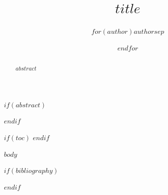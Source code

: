 \documentclass[$if(fontsize)$$fontsize$$else$11pt$endif$]{article}
\title{$title$}
\author{$for(author)$$author$$sep$ \and $endfor$}
\begin{document}
\maketitle

$if(abstract)$
\begin{abstract}
$abstract$
\end{abstract}
$endif$

$if(toc)$
\tableofcontents
$endif$

$body$

$if(bibliography)$


$endif$
\end{document}
